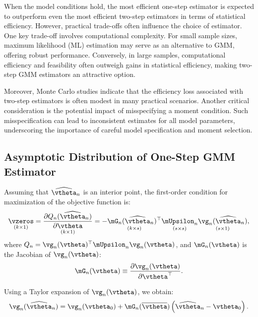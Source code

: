 When the model conditions hold, the most efficient one-step estimator is expected to outperform even the most efficient two-step estimators in terms of statistical efficiency. However, practical trade-offs often influence the choice of estimator. One key trade-off involves computational complexity. For small sample sizes, maximum likelihood (ML) estimation may serve as an alternative to GMM, offering robust performance. Conversely, in large samples, computational efficiency and feasibility often outweigh gains in statistical efficiency, making two-step GMM estimators an attractive option.

Moreover, Monte Carlo studies indicate that the efficiency loss associated with two-step estimators is often modest in many practical scenarios. Another critical consideration is the potential impact of misspecifying a moment condition. Such misspecification can lead to inconsistent estimates for all model parameters, underscoring the importance of careful model specification and moment selection.

\subsection{Asymptotic Distribution of One-Step GMM Estimator}\label{sec:gmm-one-step}

Assuming that $\widehat{\vtheta}_n$ is an interior point, the first-order condition for maximization of the objective function is:
\begin{equation}\label{eq:foc_review}
  \underset{(k\times 1)}{\vzeros} = \underset{(k\times 1)}{\frac{\partial Q_n(\widehat{\vtheta}_n)}{\partial \vtheta}} = - \underset{(k\times s)}{\mG_n(\widehat{\vtheta}_n)^\top}\underset{(s\times s)}{\mUpsilon_n}\underset{(s\times 1)}{\vg_n(\widehat{\vtheta}_n)},
\end{equation}
%
where $Q_n = \vg_n(\vtheta)^\top\mUpsilon_n\vg_n(\vtheta)$, and $\mG_n(\vtheta)$ is the Jacobian of $\vg_n(\vtheta)$:
\begin{equation*}
  \mG_n(\vtheta) \equiv  \frac{\partial \vg_n(\vtheta)}{\partial \vtheta^\top}.
\end{equation*}

Using a Taylor expansion of $\vg_n(\vtheta)$, we obtain:
\begin{equation}\label{eq:taylor_exp_g}
  \vg_n(\widehat{\vtheta}_n) = \vg_n(\vtheta_0) + \mG_n(\overline{\vtheta})\left(\widehat{\vtheta}_n - \vtheta_0\right).
\end{equation}

